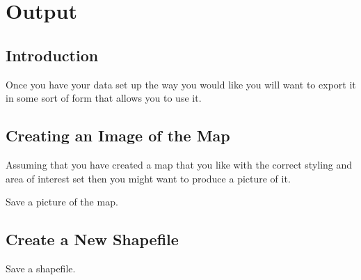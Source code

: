 \chapter{Output}

\section{Introduction}
Once you have your data set up the way you would like you will want 
to export it in some sort of form that allows you to use it.

\section{Creating an Image of the Map}
Assuming that you have created a map that you like with the correct styling and area of interest 
set then you might want to produce a picture of it.

\begin{mdframed}[linecolor=black, topline=true, bottomline=true,
  leftline=false, rightline=false]
\end{mdframed}\begin{listing}
\caption{Save a picture of the map.}
\label{save}
\end{listing}

\section{Create a New Shapefile}

\begin{mdframed}[linecolor=black, topline=true, bottomline=true,
  leftline=false, rightline=false]
\end{mdframed}\begin{listing}
\caption{Save a shapefile.}
\label{shapefile}
\end{listing}
